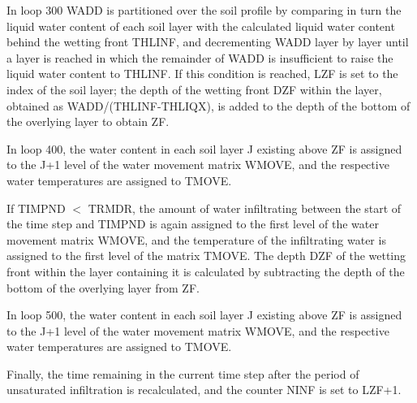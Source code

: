 In loop 300 W\+A\+D\+D is partitioned over the soil profile by comparing in turn the liquid water content of each soil layer with the calculated liquid water content behind the wetting front T\+H\+L\+I\+N\+F, and decrementing W\+A\+D\+D layer by layer until a layer is reached in which the remainder of W\+A\+D\+D is insufficient to raise the liquid water content to T\+H\+L\+I\+N\+F. If this condition is reached, L\+Z\+F is set to the index of the soil layer; the depth of the wetting front D\+Z\+F within the layer, obtained as W\+A\+D\+D/(T\+H\+L\+I\+N\+F-\/\+T\+H\+L\+I\+Q\+X), is added to the depth of the bottom of the overlying layer to obtain Z\+F.

In loop 400, the water content in each soil layer J existing above Z\+F is assigned to the J+1 level of the water movement matrix W\+M\+O\+V\+E, and the respective water temperatures are assigned to T\+M\+O\+V\+E.

If T\+I\+M\+P\+N\+D $<$ T\+R\+M\+D\+R, the amount of water infiltrating between the start of the time step and T\+I\+M\+P\+N\+D is again assigned to the first level of the water movement matrix W\+M\+O\+V\+E, and the temperature of the infiltrating water is assigned to the first level of the matrix T\+M\+O\+V\+E. The depth D\+Z\+F of the wetting front within the layer containing it is calculated by subtracting the depth of the bottom of the overlying layer from Z\+F.

In loop 500, the water content in each soil layer J existing above Z\+F is assigned to the J+1 level of the water movement matrix W\+M\+O\+V\+E, and the respective water temperatures are assigned to T\+M\+O\+V\+E.

Finally, the time remaining in the current time step after the period of unsaturated infiltration is recalculated, and the counter N\+I\+N\+F is set to L\+Z\+F+1.